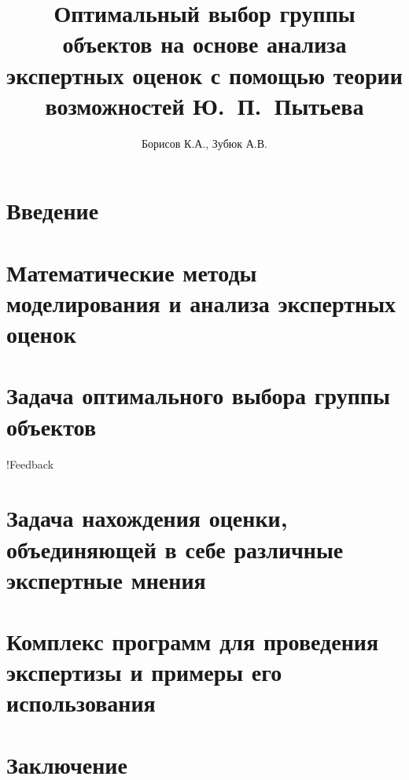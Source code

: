 \documentclass{article}
\begin{document}

\thispagestyle{empty}			

\title{Оптимальный выбор группы объектов на основе анализа экспертных оценок с помощью теории возможностей Ю.~П.~Пытьева} 
\author{Борисов К.А., Зубюк А.В.}
\maketitle

\tableofcontents
\newpage

\section{Введение} 


\section{Математические методы моделирования и анализа экспертных оценок}
% 

\section{Задача оптимального выбора группы объектов}
 !Feedback

\section{Задача нахождения оценки, объединяющей в себе различные экспертные мнения}
% 

\section{Комплекс программ для проведения экспертизы и примеры его использования }


\section{Заключение}
% 

\end{document}
